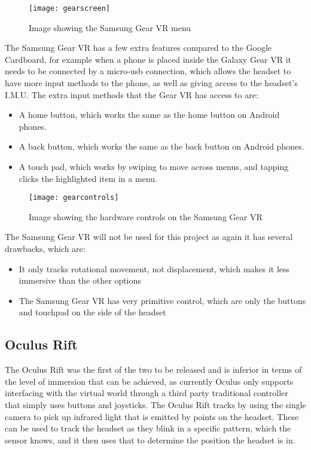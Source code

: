 \begin{figure}[h]
	\texttt{[image: gearscreen]}
	\centering
	\caption{Image showing the Samsung Gear VR menu \cite{gearmenu}}
	\label{fig:gearscreen}
\end{figure}

The Samsung Gear VR has a few extra features compared to the Google Cardboard, for example when a phone is placed inside the Galaxy Gear VR it needs to be connected by a micro-usb connection, which allows the headset to have more input methods to the phone, as well as giving access to the headset's I.M.U. The extra input methods that the Gear VR has access to are:\\

\begin{itemize}
	\item A home button, which works the same as the home button on Android phones.
	\item A back button, which works the same as the back button on Android phones.
	\item A touch pad, which works by swiping to move across menus, and tapping clicks the highlighted item in a menu.
\end{itemize}

\begin{figure}[h]
	\texttt{[image: gearcontrols]}
	\centering
	\caption{Image showing the hardware controls on the Samsung Gear VR \cite{gearbuttons}}
	\label{fig:gearcontrols}
\end{figure}

The Samsung Gear VR will not be used for this project as again it has several drawbacks, which are:

\begin{itemize}
	\item It only tracks rotational movement, not displacement, which makes it less immersive than the other options
	\item The Samsung Gear VR has very primitive control, which are only the buttons and touchpad on the side of the headset
\end{itemize}		


\subsection{Oculus Rift}
The Oculus Rift was the first of the two to be released and is inferior in terms of the level of immersion that can be achieved, as currently Oculus only supports interfacing with the virtual world through a third party traditional controller that simply uses buttons and joysticks. The Oculus Rift tracks by using the single camera to pick up infrared light that is emitted by points on the headset. These can be used to track the headset as they blink in a specific pattern, which the sensor knows, and it then uses that to determine the position the headset is in.

